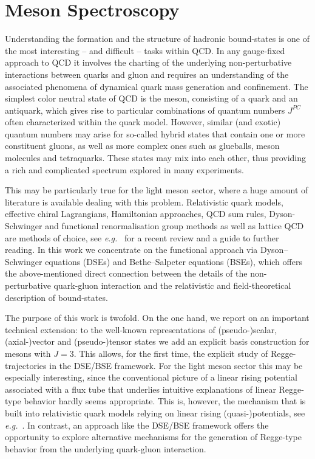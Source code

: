 \chapter{Meson Spectroscopy}
\label{chap:spectra}

Understanding the formation and the structure of hadronic bound-states is one of the most interesting 
-- and difficult -- tasks within QCD. In any gauge-fixed approach to QCD it involves the charting of 
the underlying non-perturbative interactions between quarks and gluon and requires an understanding of
the associated phenomena of dynamical quark mass generation and confinement.
The simplest color neutral state of QCD is the meson, consisting of a quark and an antiquark,
which gives rise to particular combinations of quantum numbers $J^{PC}$ often characterized within 
the quark model. However, similar (and exotic) quantum numbers may arise for so-called hybrid states 
that contain one or more constituent gluons, as well as more complex ones such as glueballs, 
meson molecules and tetraquarks. These states may mix into each other, thus providing a rich and 
complicated spectrum explored in many experiments.

This may be particularly true for the light meson sector, where a huge amount of literature is available 
dealing with this problem. Relativistic quark models, effective chiral Lagrangians, Hamiltonian
approaches, QCD sum rules, Dyson-Schwinger and functional renormalisation group methods as well as 
lattice QCD are methods of choice, see \emph{e.g.}~\cite{Brambilla:2014aaa} for a recent review and a guide 
to further reading. In this work we concentrate on the functional approach via Dyson--Schwinger 
equations (DSEs) and Bethe--Salpeter equations (BSEs), which offers the above-mentioned direct 
connection between the details of the non-perturbative quark-gluon interaction and the relativistic and 
field-theoretical description of bound-states. 

The purpose of this work is twofold. On the one hand, we report on an important technical extension: 
to the well-known representations of (pseudo-)scalar, {(axial-)}\linebreak vector and (pseudo-)tensor states 
\cite{Joos:1962qq,Weinberg:1964cn,Zemach:1968zz,Krassnigg:2010mh} we add an explicit basis construction for mesons with $J=3$. 
This allows, for the first time, the explicit study of Regge-trajectories 
in the DSE/BSE framework. For the light meson sector this may be especially interesting, since the 
conventional picture of a linear rising potential associated with a flux tube that underlies intuitive 
explanations of linear Regge-type behavior hardly seems appropriate. This is, however, the mechanism 
that is built into relativistic quark models relying on linear rising (quasi-)potentials, see 
\emph{e.g.}~\cite{Godfrey:1985xj,Ebert:2009ub}. In contrast, an approach like the DSE/BSE framework 
offers the opportunity to explore alternative mechanisms for the generation of Regge-type behavior 
from the underlying quark-gluon interaction. 

